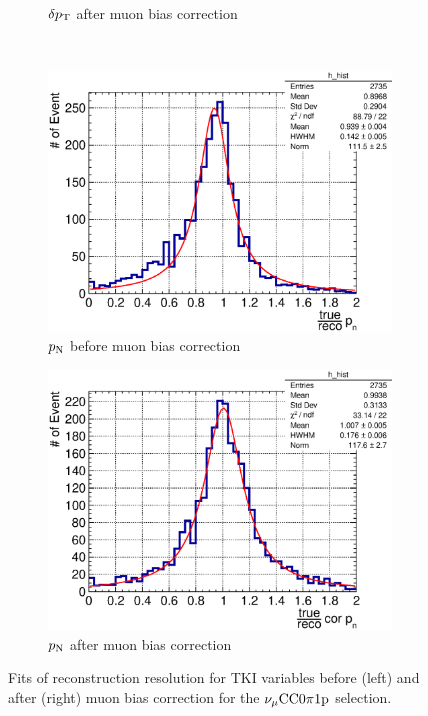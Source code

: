 \begin{figure}
\begin{subfigure}[b]{\dbfigwid\textwidth}
               \caption{$\delta p_\textrm{T}$ after muon bias correction}
               \label{subfig:esc-dpt-afmu}
          \end{subfigure}
          \\
          \begin{subfigure}[b]{\dbfigwid\textwidth}
               \centering
               \includegraphics[width=\textwidth]{figures/perf/tki/pn_rat_hist_al14.eps}
               \caption{$p_\textrm{N}$ before muon bias correction}
               \label{subfig:esc-pn-bfmu}
          \end{subfigure}
          \begin{subfigure}[b]{\dbfigwid\textwidth}
               \centering
               \includegraphics[width=\textwidth]{figures/perf/tki/cor_pn_rat_hist_al14.eps}
               \caption{$p_\textrm{N}$ after muon bias correction}
               \label{subfig:esc-pn-afmu}
          \end{subfigure}
          \caption{Fits of reconstruction resolution for TKI variables before (left) and after (right) muon bias correction for the $\nu_{\mu}\textrm{CC}0\pi1\textrm{p}$ selection.}
          \label{fig:mc-tki-0pi-mubias}
     \end{figure}

